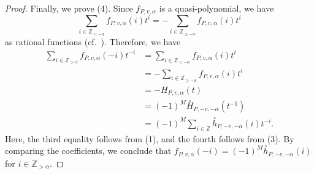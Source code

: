 \documentclass[ALCO,published]{cedram}
\theoremstyle{remark}
\begin{document}
\begin{proof}
Finally, we prove (4). 
Since $f_{P,v,\alpha}$ is a quasi-polynomial, we have
\[
\sum _{i \in \mathbb{Z}_{< - \alpha}} {f_{P,v,\alpha}(i)} t^{i} 
= - \sum _{i \in \mathbb{Z}_{\ge - \alpha}} {f_{P,v,\alpha}(i)} t^i
\]
as rational functions (cf.~\cite[Exercise 4.7]{BR}). 
Therefore, we have 
\begin{align*}
\sum _{i \in \mathbb{Z}_{> \alpha}} {f_{P,v,\alpha}(- i)} t^{- i}
&= \sum _{i \in \mathbb{Z}_{< - \alpha}} {f_{P,v,\alpha}(i)} t^{i} \\ 
&=- \sum _{i \in \mathbb{Z}_{\ge - \alpha}} {f_{P,v,\alpha}(i)} t^i \\
&=- H_{P,v,\alpha}(t) \\
&= (-1)^{M} \overset{\circ}{H}_{P, -v, - \alpha}(t^{-1}) \\
&= (-1)^{M} \sum _{i \in \mathbb{Z}} \overset{\circ}{h}_{P, -v, - \alpha}(i) t^{-i}. 
\end{align*}
Here, the third equality follows from (1), and the fourth follows from (3). 
By comparing the coefficients, we conclude that $f_{P,v,\alpha}(- i) = (-1)^M \overset{\circ}{h}_{P, -v, - \alpha}(i)$ for $i \in \mathbb{Z}_{> \alpha}$. 
\end{proof}
 



\end{document}
